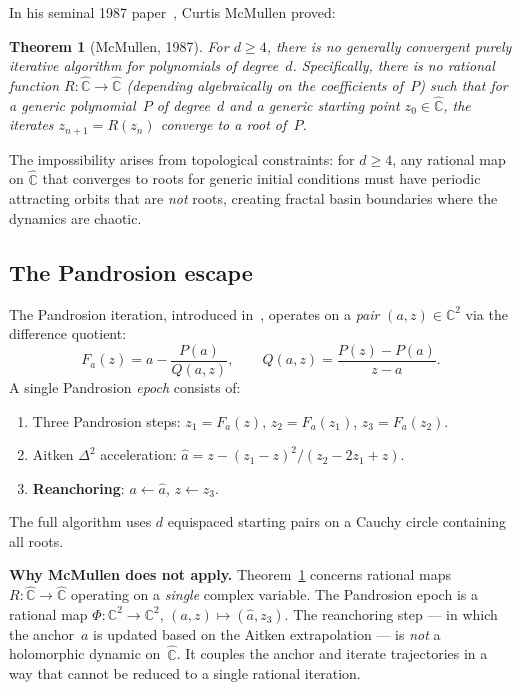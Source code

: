 \documentclass[11pt,a4paper]{article}
\newtheorem{theorem}{Theorem}[section]
\theoremstyle{definition}
\theoremstyle{remark}
\begin{document}
In his seminal 1987 paper~\cite{McMullen1987}, Curtis McMullen proved:

\begin{theorem}[McMullen, 1987]
\label{thm:mcmullen}
For $d \geq 4$, there is no generally convergent purely iterative algorithm for polynomials of degree~$d$.  Specifically, there is no rational function $R: \hat{\mathbb{C}} \to \hat{\mathbb{C}}$ (depending algebraically on the coefficients of~$P$) such that for a generic polynomial~$P$ of degree~$d$ and a generic starting point $z_0 \in \hat{\mathbb{C}}$, the iterates $z_{n+1} = R(z_n)$ converge to a root of~$P$.
\end{theorem}

The impossibility arises from topological constraints: for $d \geq 4$, any rational map on $\hat{\mathbb{C}}$ that converges to roots for generic initial conditions must have periodic attracting orbits that are \emph{not} roots, creating fractal basin boundaries where the dynamics are chaotic.

\subsection{The Pandrosion escape}

The Pandrosion iteration, introduced in~\cite{Besevic2026a}, operates on a \emph{pair} $(a, z) \in \mathbb{C}^2$ via the difference quotient:
\[
F_a(z) = a - \frac{P(a)}{Q(a, z)}, \qquad Q(a, z) = \frac{P(z) - P(a)}{z - a}.
\]
A single Pandrosion \emph{epoch} consists of:
\begin{enumerate}[nosep]
\item Three Pandrosion steps: $z_1 = F_a(z)$, $z_2 = F_a(z_1)$, $z_3 = F_a(z_2)$.
\item Aitken $\Delta^2$ acceleration: $\hat{a} = z - (z_1 - z)^2 / (z_2 - 2z_1 + z)$.
\item \textbf{Reanchoring}: $a \leftarrow \hat{a}$, $z \leftarrow z_3$.
\end{enumerate}
The full algorithm uses $d$ equispaced starting pairs on a Cauchy circle containing all roots.

\medskip
\noindent\textbf{Why McMullen does not apply.}  Theorem~\ref{thm:mcmullen} concerns rational maps $R: \hat{\mathbb{C}} \to \hat{\mathbb{C}}$ operating on a \emph{single} complex variable.  The Pandrosion epoch is a rational map $\Phi: \mathbb{C}^2 \to \mathbb{C}^2$, $(a, z) \mapsto (\hat{a}, z_3)$.  The reanchoring step --- in which the anchor~$a$ is updated based on the Aitken extrapolation --- is \emph{not} a holomorphic dynamic on~$\hat{\mathbb{C}}$.  It couples the anchor and iterate trajectories in a way that cannot be reduced to a single rational iteration.
\end{document}

